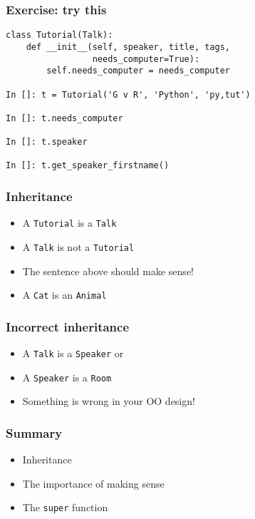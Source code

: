 \documentclass[14pt,compress,aspectratio=169]{beamer}
\begin{document}
\begin{frame}[fragile]
  \frametitle{Exercise: try this}
\begin{lstlisting}
class Tutorial(Talk):
    def __init__(self, speaker, title, tags,
                 needs_computer=True):
        self.needs_computer = needs_computer

In []: t = Tutorial('G v R', 'Python', 'py,tut')

In []: t.needs_computer

In []: t.speaker

In []: t.get_speaker_firstname()

\end{lstlisting}
\end{frame}

\begin{frame}
  \frametitle{Inheritance}
  \begin{itemize}
  \item A \lstinline{Tutorial} is a \lstinline{Talk}
  \item A \lstinline{Talk} is not a \lstinline{Tutorial}
  \item The sentence above should make sense!
  \item A \lstinline{Cat} is an \lstinline{Animal}
  \end{itemize}
\end{frame}

\begin{frame}
  \frametitle{Incorrect inheritance}
  \begin{itemize}
  \item A \lstinline{Talk} is a \lstinline{Speaker} or
  \item A \lstinline{Speaker} is a \lstinline{Room}
  \item Something is wrong in your OO design!
  \end{itemize}
\end{frame}

\begin{frame}[fragile]
  \frametitle{Summary}
  \begin{itemize}
  \item Inheritance
  \item The importance of making sense
  \item The \lstinline{super} function
  \end{itemize}
\end{frame}

\end{document}
